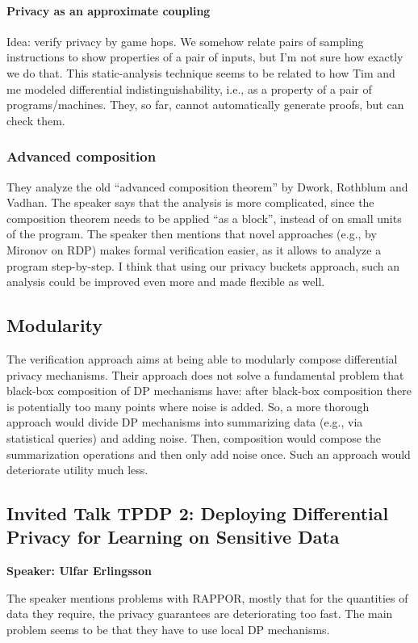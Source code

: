 \documentclass{article}
\begin{document}
\paragraph{Privacy as an approximate coupling}
Idea: verify privacy by game hops. We somehow relate pairs of sampling instructions to show properties of a pair of inputs, but I'm not sure how exactly we do that. This static-analysis technique seems to be related to how Tim and me modeled differential indistinguishability, i.e., as a property of a pair of programs/machines. They, so far, cannot automatically generate proofs, but can check them.

\subsubsection{Advanced composition}
They analyze the old ``advanced composition theorem'' by Dwork, Rothblum and Vadhan. The speaker says that the analysis is more complicated, since the composition theorem needs to be applied ``as a block'', instead of on small units of the program. The speaker then mentions that novel approaches (e.g., by Mironov on RDP) makes formal verification easier, as it allows to analyze a program step-by-step.
I think that using our privacy buckets approach, such an analysis could be improved even more and made flexible as well.

\subsection{Modularity}
The verification approach aims at being able to modularly compose differential privacy mechanisms. Their approach does not solve a fundamental problem that black-box composition of DP mechanisms have: after black-box composition there is potentially too many points where noise is added. So, a more thorough approach would divide DP mechanisms into summarizing data (e.g., via statistical queries) and adding noise. Then, composition would compose the summarization operations and then only add noise once. Such an approach would deteriorate utility much less.


\subsection{Invited Talk TPDP 2: Deploying Differential Privacy for Learning on Sensitive Data}
\noindent\textbf{Speaker: Ulfar Erlingsson}

The speaker mentions problems with RAPPOR, mostly that for the quantities of data they require, the privacy guarantees are deteriorating too fast. The main problem seems to be that they have to use local DP mechanisms. 
\end{document}
